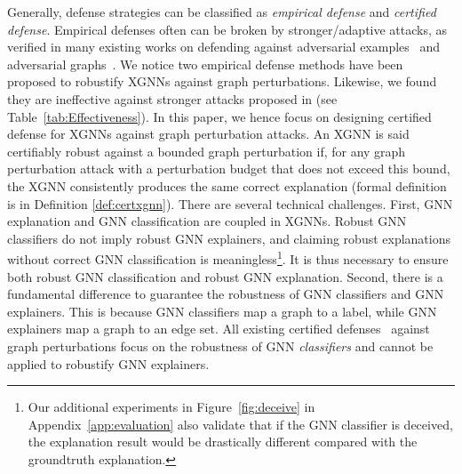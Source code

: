 Generally, defense strategies can be classified as \emph{empirical defense} and \emph{certified defense}. Empirical defenses often can be  broken by stronger/adaptive attacks, as verified in many existing works on defending against adversarial examples~\citep{carlini2019evaluating} and adversarial graphs~\citep{zhang2020backdoor,yang2024distributed}. 
We notice two empirical defense methods  \citep{bajaj2021robust,wang2023vinfor} have been proposed to  robustify XGNNs against graph perturbations. 
Likewise, we found they are ineffective against stronger attacks proposed in \cite{li2024graph} (see Table~\ref{tab:Effectiveness}). 
In this paper, we hence focus on designing certified defense for XGNNs against graph perturbation attacks. {An XGNN is said certifiably robust against a bounded graph perturbation if, for any graph perturbation attack with a perturbation budget that does not exceed this bound, the XGNN consistently produces the same correct explanation (formal definition is in Definition \ref{def:certxgnn}).} 
There are several technical challenges. 
First, GNN explanation and GNN classification are coupled in XGNNs. Robust GNN classifiers do not imply robust GNN explainers, and 
claiming robust explanations without correct GNN classification is meaningless\footnote{Our additional experiments in Figure~\ref{fig:deceive} in Appendix~\ref{app:evaluation} also validate that if the GNN classifier is deceived, the explanation result would be drastically different compared with the groundtruth explanation.}. It is thus necessary to ensure both robust GNN classification and robust GNN explanation. 
Second, there is a fundamental difference to guarantee the robustness of GNN classifiers and GNN explainers. This is because GNN classifiers map a graph to a label, while  GNN explainers map a graph to an edge set. All existing certified defenses~\citep{jia2020certified,jin2020certified, wang2021certified,xia2024gnncert,li2025agnncert} against graph perturbations focus on the robustness of GNN \emph{classifiers} and cannot be applied to robustify GNN explainers.     


